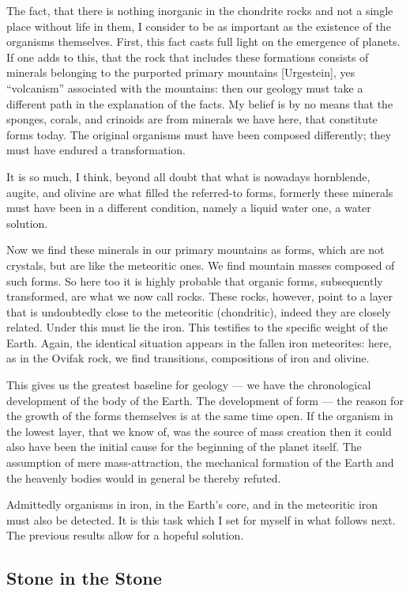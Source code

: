 \documentclass[a4paper, 12pt, oneside]{article}
\begin{document}
The fact, that there is nothing inorganic in the chondrite rocks and not a single place without life in them, I consider to be as important as the existence of the organisms themselves. First, this fact casts full light on the emergence of planets. If one adds to this, that the rock that includes these formations consists of minerals belonging to the purported primary mountains [Urgestein], yes ``volcanism'' associated with the mountains: then our geology must take a different path in the explanation of the facts. My belief is by no means that the sponges, corals, and crinoids are from minerals we have here, that constitute forms today. The original organisms must have been composed differently; they must have endured a transformation.

It is so much, I think, beyond all doubt that what is nowadays hornblende, augite, and olivine are what filled the referred-to forms, formerly these minerals must have been in a different condition, namely a liquid water one, a water solution.

Now we find these minerals in our primary mountains as forms, which are not crystals, but are like the meteoritic ones. We find mountain masses composed of such forms. So here too it is highly probable that organic forms, subsequently transformed, are what we now call rocks. These rocks, however, point to a layer that is undoubtedly close to the meteoritic (chondritic), indeed they are closely related. Under this must lie the iron. This testifies to the specific weight of the Earth. Again, the identical situation appears in the fallen iron meteorites: here, as in the Ovifak rock, we find transitions, compositions of iron and olivine.

This gives us the greatest baseline for geology — we have the chronological development of the body of the Earth. The development of form — the reason for the growth of the forms themselves is at the same time open. If the organism in the lowest layer, that we know of, was the source of mass creation then it could also have been the initial cause for the beginning of the planet itself. The assumption of mere mass-attraction, the mechanical formation of the Earth and the heavenly bodies would in general be thereby refuted.

Admittedly organisms in iron, in the Earth's core, and in the meteoritic iron must also be detected. It is this task which I set for myself in what follows next. The previous results allow for a hopeful solution.
\clearpage
\subsection{Stone in the Stone}
\end{document}
